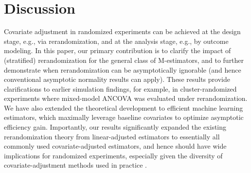 \documentclass[12pt]{article}
\begin{document}
{\section{Discussion}\label{sec: discussion}
Covariate adjustment in randomized experiments can be achieved at the design stage, e.g., via rerandomization, and at the analysis stage, e.g., by outcome modeling. In this paper, our primary contribution is to clarify the impact of (stratified) rerandomization for the general class of M-estimators, and to further demonstrate when rerandomization can be asymptotically ignorable (and hence conventional asymptotic normality results can apply). These results provide clarifications to earlier simulation findings, for example, in cluster-randomized experiments \citep{li2016evaluation,li2017evaluation} where mixed-model ANCOVA was evaluated under rerandomization. We have also extended the theoretical development to efficient machine learning estimators, which maximally leverage baseline covariates to optimize asymptotic efficiency gain. Importantly, our results significantly expanded the existing rerandomization theory \citep{li2018asymptotic,li2020rerandomization,lu2023design,wang2023rerandomization,zhao2024no} from linear-adjusted estimators to essentially all commonly used covariate-adjusted estimators, and hence should have wide implications for randomized experiments, especially given the diversity of covariate-adjustment methods used in practice \citep{FDA2023}.


}
\end{document}
